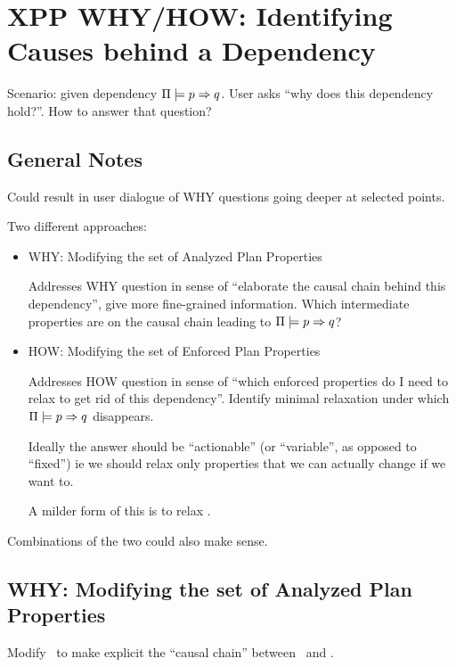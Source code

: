 \section{XPP WHY/HOW: Identifying Causes behind a Dependency}
\label{xpp-identify-causes}

Scenario: given dependency $\Pi \models p \Rightarrow q$. User
asks ``why does this dependency hold?''. How to answer that question?



\subsection{General Notes}

Could result in user dialogue of WHY questions going deeper at
selected points.

Two different approaches:
\begin{itemize}
\item WHY: Modifying the set of Analyzed Plan Properties

  Addresses WHY question in sense of ``elaborate the causal chain
  behind this dependency'', give more fine-grained information. Which
  intermediate properties are on the causal chain leading to
  $\Pi \models p \Rightarrow q$?

\item HOW: Modifying the set of Enforced Plan Properties

  Addresses HOW question in sense of ``which enforced properties do I
  need to relax to get rid of this dependency''. Identify minimal
  relaxation under which $\Pi \models p \Rightarrow q$ disappears.

  Ideally the answer should be ``actionable'' (or ``variable'', as
  opposed to ``fixed'') ie we should relax only properties that we can
  actually change if we want to.

  A milder form of this is to relax \prop.

\end{itemize}

Combinations of the two could also make sense.




\subsection{WHY: Modifying the set of Analyzed Plan Properties}
\label{xpp:identify-causes:analyzed}


Modify \props\ to make explicit the ``causal chain'' between
\prop\ and \propq. 

